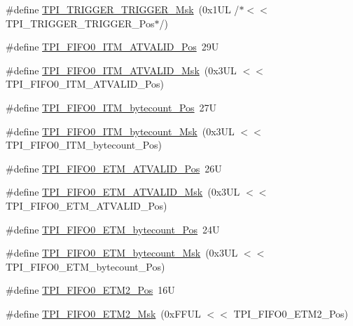 \begin{DoxyCompactItemize}
\item 
\#define \hyperlink{group___c_m_s_i_s___t_p_i_ga814227af2b2665a0687bb49345e21110}{T\+P\+I\+\_\+\+T\+R\+I\+G\+G\+E\+R\+\_\+\+T\+R\+I\+G\+G\+E\+R\+\_\+\+Msk}~(0x1\+U\+L /$\ast$$<$$<$ T\+P\+I\+\_\+\+T\+R\+I\+G\+G\+E\+R\+\_\+\+T\+R\+I\+G\+G\+E\+R\+\_\+\+Pos$\ast$/)
\item 
\#define \hyperlink{group___c_m_s_i_s___t_p_i_gaa7e050e9eb6528241ebc6835783b6bae}{T\+P\+I\+\_\+\+F\+I\+F\+O0\+\_\+\+I\+T\+M\+\_\+\+A\+T\+V\+A\+L\+I\+D\+\_\+\+Pos}~29U
\item 
\#define \hyperlink{group___c_m_s_i_s___t_p_i_ga94cb2493ed35d2dab7bd4092b88a05bc}{T\+P\+I\+\_\+\+F\+I\+F\+O0\+\_\+\+I\+T\+M\+\_\+\+A\+T\+V\+A\+L\+I\+D\+\_\+\+Msk}~(0x3\+U\+L $<$$<$ T\+P\+I\+\_\+\+F\+I\+F\+O0\+\_\+\+I\+T\+M\+\_\+\+A\+T\+V\+A\+L\+I\+D\+\_\+\+Pos)
\item 
\#define \hyperlink{group___c_m_s_i_s___t_p_i_gac2b6f7f13a2fa0be4aa7645a47dcac52}{T\+P\+I\+\_\+\+F\+I\+F\+O0\+\_\+\+I\+T\+M\+\_\+bytecount\+\_\+\+Pos}~27U
\item 
\#define \hyperlink{group___c_m_s_i_s___t_p_i_ga07bafa971b8daf0d63b3f92b9ae7fa16}{T\+P\+I\+\_\+\+F\+I\+F\+O0\+\_\+\+I\+T\+M\+\_\+bytecount\+\_\+\+Msk}~(0x3\+U\+L $<$$<$ T\+P\+I\+\_\+\+F\+I\+F\+O0\+\_\+\+I\+T\+M\+\_\+bytecount\+\_\+\+Pos)
\item 
\#define \hyperlink{group___c_m_s_i_s___t_p_i_ga7fdeb3e465ca4aa9e3b2f424ab3bbd1d}{T\+P\+I\+\_\+\+F\+I\+F\+O0\+\_\+\+E\+T\+M\+\_\+\+A\+T\+V\+A\+L\+I\+D\+\_\+\+Pos}~26U
\item 
\#define \hyperlink{group___c_m_s_i_s___t_p_i_ga4f0005dc420b28f2369179a935b9a9d3}{T\+P\+I\+\_\+\+F\+I\+F\+O0\+\_\+\+E\+T\+M\+\_\+\+A\+T\+V\+A\+L\+I\+D\+\_\+\+Msk}~(0x3\+U\+L $<$$<$ T\+P\+I\+\_\+\+F\+I\+F\+O0\+\_\+\+E\+T\+M\+\_\+\+A\+T\+V\+A\+L\+I\+D\+\_\+\+Pos)
\item 
\#define \hyperlink{group___c_m_s_i_s___t_p_i_ga2f738e45386ebf58c4d406f578e7ddaf}{T\+P\+I\+\_\+\+F\+I\+F\+O0\+\_\+\+E\+T\+M\+\_\+bytecount\+\_\+\+Pos}~24U
\item 
\#define \hyperlink{group___c_m_s_i_s___t_p_i_gad2536b3a935361c68453cd068640af92}{T\+P\+I\+\_\+\+F\+I\+F\+O0\+\_\+\+E\+T\+M\+\_\+bytecount\+\_\+\+Msk}~(0x3\+U\+L $<$$<$ T\+P\+I\+\_\+\+F\+I\+F\+O0\+\_\+\+E\+T\+M\+\_\+bytecount\+\_\+\+Pos)
\item 
\#define \hyperlink{group___c_m_s_i_s___t_p_i_ga5f0037cc80c65e86d9e94e5005077a48}{T\+P\+I\+\_\+\+F\+I\+F\+O0\+\_\+\+E\+T\+M2\+\_\+\+Pos}~16U
\item 
\#define \hyperlink{group___c_m_s_i_s___t_p_i_gaa82a7b9b99c990fb12eafb3c84b68254}{T\+P\+I\+\_\+\+F\+I\+F\+O0\+\_\+\+E\+T\+M2\+\_\+\+Msk}~(0x\+F\+F\+U\+L $<$$<$ T\+P\+I\+\_\+\+F\+I\+F\+O0\+\_\+\+E\+T\+M2\+\_\+\+Pos)
$$
\end{DoxyCompactItemize}
